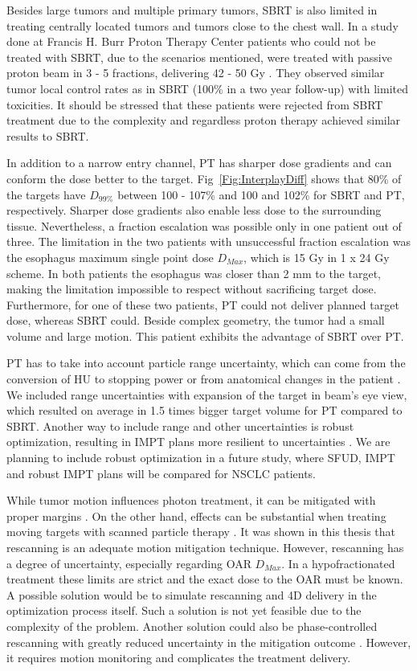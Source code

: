 Besides large tumors and multiple primary tumors, SBRT is also limited in treating centrally located tumors and tumors close to the chest wall.
In a study done at Francis H. Burr Proton Therapy Center 
patients who could not be treated with SBRT, due to the scenarios mentioned, were treated with passive proton beam in 3 - 5 fractions, 
delivering 42 - 50 Gy \cite{Westover2012}. They observed similar tumor local control rates as in SBRT (100\% in a two year follow-up) with limited toxicities. 
It should be stressed that these patients were rejected from SBRT treatment due to the complexity and regardless proton therapy achieved similar results
to SBRT.

In addition to a narrow entry channel, PT has sharper dose gradients and can conform the dose better to the target. Fig~\ref{Fig:InterplayDiff} shows that 80\% of the targets have $D_{99\%}$
between 100 - 107\% and 100 and 102\% for SBRT and PT, respectively. Sharper dose gradients also enable less dose to the surrounding tissue. Nevertheless, a fraction escalation
was possible only in one patient out of three. The limitation in the two patients with unsuccessful fraction escalation was the esophagus maximum single point dose $D_{Max}$, 
which is 15 Gy in 1 x 24 Gy scheme. In both patients the esophagus was closer than 2 mm to the target, making the limitation impossible to respect without sacrificing target dose.
Furthermore, for one of these two patients, PT could not deliver planned target dose, whereas SBRT could. Beside complex geometry, the tumor had a small volume and 
large motion. This patient exhibits the advantage of SBRT over PT.

PT has to take into account particle range uncertainty, which can come from the conversion of HU to stopping power \cite{Schneider1996}
or from anatomical changes in the patient \cite{Unkelbach2009}. We included range uncertainties with expansion of the target in beam's eye view, which resulted on average in 1.5 times bigger
target volume for PT compared to SBRT. Another way to include range and other uncertainties is robust optimization, resulting in IMPT plans more resilient to uncertainties \cite{Unkelbach2009, Chen2012}.
We are planning to include robust optimization in a future study, where SFUD, IMPT and robust IMPT plans will be compared for NSCLC patients.

While tumor motion influences photon treatment, it can be mitigated with proper margins \cite{Zou2014}. 
On the other hand, effects can be substantial when treating moving targets with scanned particle therapy \cite{Bert2008}.
It was shown in this thesis that rescanning is an adequate motion mitigation technique. However, rescanning has a degree of uncertainty, 
especially regarding OAR $D_{Max}$.
In a hypofractionated treatment these limits are strict and the exact dose to the OAR must be known. 
A possible solution would be to simulate rescanning and 4D delivery in the optimization process itself. 
Such a solution is not yet feasible due to the complexity of the problem. Another solution could also be phase-controlled rescanning with greatly reduced
uncertainty in the mitigation outcome \cite{Mori2013,Takahashi2014}. However,
it requires motion monitoring and complicates the treatment delivery.

